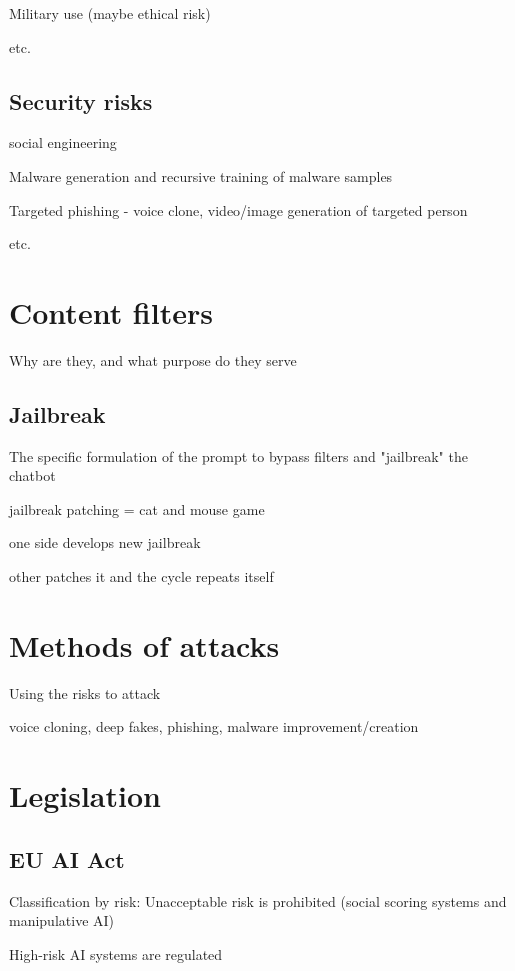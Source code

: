 Military use (maybe ethical risk)

etc.

\subsection{Security risks}
social engineering

Malware generation and recursive training of malware samples

Targeted phishing - voice clone, video/image generation of targeted person

etc.

\section{Content filters}
Why are they, and what purpose do they serve

\subsection{Jailbreak}
The specific formulation of the prompt to bypass filters and "jailbreak" the chatbot

jailbreak patching = cat and mouse game

one side develops new jailbreak
    
other patches it and the cycle repeats itself
    



\section{Methods of attacks}
Using the risks to attack

voice cloning, deep fakes, phishing, malware improvement/creation 

\section{Legislation}

\subsection{EU AI Act}



Classification by risk:
Unacceptable risk is prohibited (social scoring systems and manipulative AI)

High-risk AI systems are regulated

